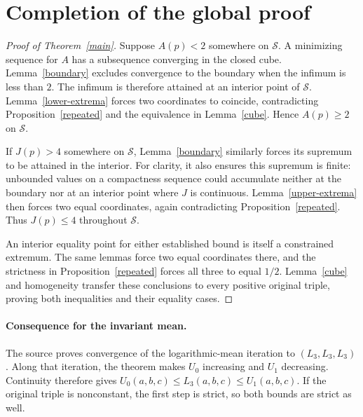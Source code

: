 \documentclass[11pt]{article}
\begin{document}
\section{Completion of the global proof}
\begin{proof}[Proof of Theorem~\ref{main}]
Suppose $A(p)<2$ somewhere on $\mathcal S$. A minimizing sequence for $A$
has a subsequence converging in the closed cube. Lemma~\ref{boundary}
excludes convergence to the boundary when the infimum is less than $2$.
The infimum is therefore attained at an interior point of $\mathcal S$.
Lemma~\ref{lower-extrema} forces two coordinates to coincide, contradicting
Proposition~\ref{repeated} and the equivalence in Lemma~\ref{cube}.
Hence $A(p)\geq2$ on $\mathcal S$.

If $J(p)>4$ somewhere on $\mathcal S$, Lemma~\ref{boundary} similarly
forces its supremum to be attained in the interior. For clarity, it also
ensures this supremum is finite: unbounded values on a compactness sequence
could accumulate neither at the boundary nor at an interior point where
$J$ is continuous. Lemma~\ref{upper-extrema} then forces two equal
coordinates, again contradicting Proposition~\ref{repeated}.
Thus $J(p)\leq4$ throughout $\mathcal S$.

An interior equality point for either established bound is itself a
constrained extremum. The same lemmas force two equal coordinates there,
and the strictness in Proposition~\ref{repeated} forces all three to equal
$1/2$. Lemma~\ref{cube} and homogeneity transfer these conclusions to every
positive original triple, proving both inequalities and their equality cases.
\end{proof}

\paragraph{Consequence for the invariant mean.}
The source proves convergence of the logarithmic-mean iteration to
$(L_3,L_3,L_3)$. Along that iteration, the theorem makes $U_0$ increasing
and $U_1$ decreasing. Continuity therefore gives
$U_0(a,b,c)\leq L_3(a,b,c)\leq U_1(a,b,c)$.
If the original triple is nonconstant, the first step is strict, so both
bounds are strict as well.
\end{document}
